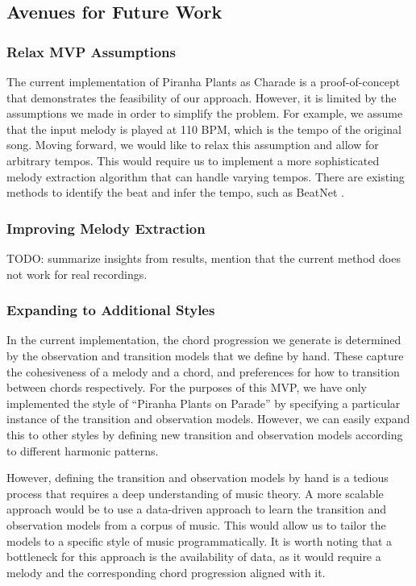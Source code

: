 \subsection{Avenues for Future Work}
\label{sec:avenues}

\subsubsection{Relax MVP Assumptions}

The current implementation of Piranha Plants as Charade is a proof-of-concept that demonstrates the feasibility of our approach. However, it is limited by the assumptions we made in order to simplify the problem. For example, we assume that the input melody is played at 110 BPM, which is the tempo of the original song. Moving forward, we would like to relax this assumption and allow for arbitrary tempos. This would require us to implement a more sophisticated melody extraction algorithm that can handle varying tempos. There are existing methods to identify the beat and infer the tempo, such as BeatNet \cite{BeatNet:2021}.

\subsubsection{Improving Melody Extraction}

TODO: summarize insights from results, mention that the current method does not work for real recordings.

\subsubsection{Expanding to Additional Styles}

In the current implementation, the chord progression we generate is determined by the observation and transition models that we define by hand. These capture the cohesiveness of a melody and a chord, and preferences for how to transition between chords respectively. For the purposes of this MVP, we have only implemented the style of ``Piranha Plants on Parade'' by specifying a particular instance of the transition and observation models. However, we can easily expand this to other styles by defining new transition and observation models according to different harmonic patterns.

However, defining the transition and observation models by hand is a tedious process that requires a deep understanding of music theory. A more scalable approach would be to use a data-driven approach to learn the transition and observation models from a corpus of music. This would allow us to tailor the models to a specific style of music programmatically. It is worth noting that a bottleneck for this approach is the availability of data, as it would require a melody and the corresponding chord progression aligned with it.

